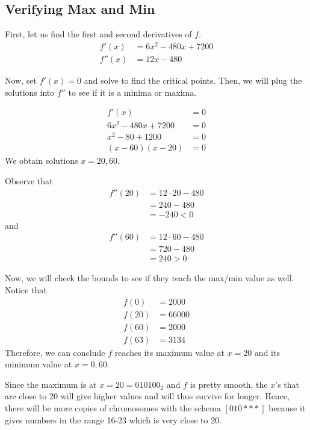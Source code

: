 \subsection{Verifying Max and Min}

First, let us find the first and second derivatives of \(f\).
\[
\begin{aligned}
    f'(x) &= 6x^2 - 480x + 7200 \\
    f''(x) &= 12x - 480
\end{aligned}
\]

Now, set \(f'(x) = 0\) and solve to find the critical points. Then, we will plug the solutions into \(f''\) to see if it is a minima or maxima.

\[
\begin{aligned}
    f'(x) &= 0 \\
    6x^2 - 480x + 7200 &= 0 \\
    x^2 - 80 + 1200 &= 0 \\
    (x-60)(x-20) &= 0
\end{aligned}
\]
We obtain solutions \(x=20, 60\).

Observe that
\[
\begin{aligned}
    f''(20) &= 12 \cdot 20 - 480 \\
            &= 240 - 480 \\
            &= -240 < 0
\end{aligned}
\]
and
\[
\begin{aligned}
    f''(60) &= 12 \cdot 60 - 480 \\
            &= 720 - 480 \\
            &= 240 > 0
\end{aligned}
\]

Now, we will check the bounds to see if they reach the max/min value as well. Notice that
\[
\begin{aligned}
    f(0) &= 2000 \\
    f(20) &= 66000 \\
    f(60) &= 2000 \\
    f(63) &= 3134
\end{aligned}
\]
Therefore, we can conclude \(f\) reaches its maximum value at \(x=20\) and its minimum value at \(x=0, 60\).

Since the maximum is at \(x = 20 = 010100_2\) and \(f\) is pretty smooth, the \(x\)'s that are close to 20 will give higher values and will thus survive for longer. Hence, there will be more copies of chromosomes with the schema \([010{{}***{}}]\) because it gives numbers in the range 16-23 which is very close to 20.

